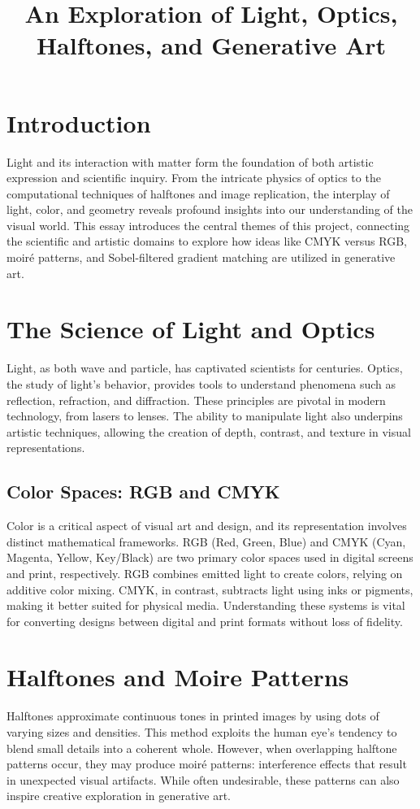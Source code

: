 \documentclass{article}
\title{An Exploration of Light, Optics, Halftones, and Generative Art}
\author{}
\date{}
\begin{document}
\maketitle

\section*{Introduction}
Light and its interaction with matter form the foundation of both artistic expression and scientific inquiry. From the intricate physics of optics to the computational techniques of halftones and image replication, the interplay of light, color, and geometry reveals profound insights into our understanding of the visual world. This essay introduces the central themes of this project, connecting the scientific and artistic domains to explore how ideas like CMYK versus RGB, moir\'{e} patterns, and Sobel-filtered gradient matching are utilized in generative art.

\section*{The Science of Light and Optics}
Light, as both wave and particle, has captivated scientists for centuries. Optics, the study of light's behavior, provides tools to understand phenomena such as reflection, refraction, and diffraction. These principles are pivotal in modern technology, from lasers to lenses. The ability to manipulate light also underpins artistic techniques, allowing the creation of depth, contrast, and texture in visual representations.

\subsection*{Color Spaces: RGB and CMYK}
Color is a critical aspect of visual art and design, and its representation involves distinct mathematical frameworks. RGB (Red, Green, Blue) and CMYK (Cyan, Magenta, Yellow, Key/Black) are two primary color spaces used in digital screens and print, respectively. RGB combines emitted light to create colors, relying on additive color mixing. CMYK, in contrast, subtracts light using inks or pigments, making it better suited for physical media. Understanding these systems is vital for converting designs between digital and print formats without loss of fidelity.

\section*{Halftones and Moire Patterns}
Halftones approximate continuous tones in printed images by using dots of varying sizes and densities. This method exploits the human eye's tendency to blend small details into a coherent whole. However, when overlapping halftone patterns occur, they may produce moir\'{e} patterns: interference effects that result in unexpected visual artifacts. While often undesirable, these patterns can also inspire creative exploration in generative art.
\end{document}
